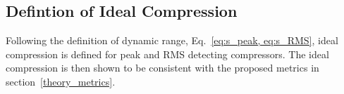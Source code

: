 \documentclass[../main2.tex]{subfiles}
\providecommand{\rootdir}{..}
\begin{document}
\FloatBarrier
\subsection{Defintion of Ideal Compression}\label{method_ideal_peak_compression}
Following the definition of dynamic range, Eq.~\eqref{eq:s_peak, eq:s_RMS}, ideal compression is defined for peak and RMS detecting compressors. The ideal compression is then shown to be consistent with the proposed metrics in section~\ref{theory_metrics}.

%

\end{document}
